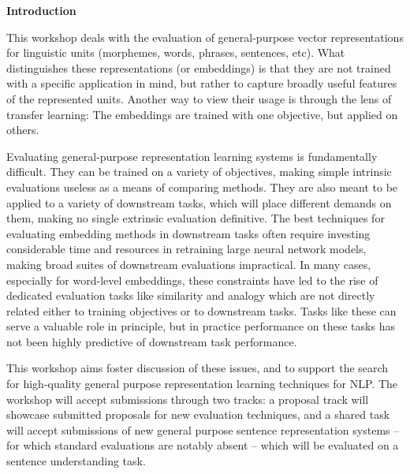 \documentclass[11pt]{article}
\begin{document}
\begin{center}
  {\Large \bf Introduction}
\end{center}

\vspace*{0.5cm}


This workshop deals with the evaluation of general-purpose vector representations for linguistic units (morphemes, words, phrases, sentences, etc). What distinguishes these representations (or embeddings) is that they are not trained with a specific application in mind, but rather to capture broadly useful features of the represented units. Another way to view their usage is through the lens of transfer learning: The embeddings are trained with one objective, but applied on others.

Evaluating general-purpose representation learning systems is fundamentally difficult. They can be trained on a variety of objectives, making simple intrinsic evaluations useless as a means of comparing methods. They are also meant to be applied to a variety of downstream tasks, which will place different demands on them, making no single extrinsic evaluation definitive. The best techniques for evaluating embedding methods in downstream tasks often require investing considerable time and resources in retraining large neural network models, making broad suites of downstream evaluations impractical. In many cases, especially for word-level embeddings, these constraints have led to the rise of dedicated evaluation tasks like similarity and analogy which are not directly related either to training objectives or to downstream tasks. Tasks like these can serve a valuable role in principle, but in practice performance on these tasks has not been highly predictive of downstream task performance.

This workshop aims foster discussion of these issues, and to support the search for high-quality general purpose representation learning techniques for NLP. The workshop will accept submissions through two tracks: a proposal track will showcase submitted proposals for new evaluation techniques, and a shared task will accept submissions of new general purpose sentence representation systems -- for which standard evaluations are notably absent -- which will be evaluated on a sentence understanding task.
\end{document}
